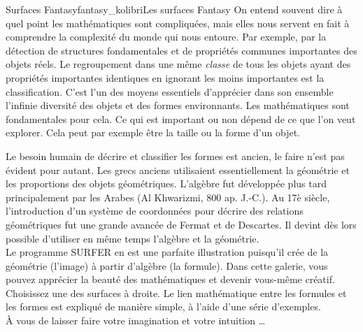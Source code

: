 \begin{surferIntroPage}{Surfaces Fantasy}{fantasy_kolibri}{Les surfaces Fantasy}
On entend souvent dire à quel point les mathématiques sont compliquées, mais elles nous servent en fait à comprendre la complexité du monde qui nous entoure. Par exemple, par la détection de structures fondamentales et de propriétés communes importantes des objets réels. Le regroupement dans une même \textit{classe} de tous les objets ayant des propriétés importantes identiques en ignorant les moins importantes est la classification. C'est l'un des moyens essentiels d'apprécier dans son ensemble l'infinie diversité des objets et des formes environnants. Les mathématiques sont fondamentales pour cela. Ce qui est important ou non dépend de ce que l'on veut explorer. Cela peut par exemple être la taille ou la forme d'un objet.
\\

\vspace{0.4cm}

Le besoin humain de décrire et classifier les formes est ancien, le faire n'est pas évident pour autant. Les grecs anciens utilisaient essentiellement la géométrie et les proportions des objets géométriques. L'algèbre fut développée plus tard principalement par les Arabes (Al Khwarizmi, 800 ap. J.-C.). Au 17è siècle, l'introduction d'un système de coordonnées pour décrire des relations géométriques fut une grande avancée de Fermat et de Descartes. Il devint dès lors possible d'utiliser en même temps l'algèbre et la géométrie.
\\
\vspace{0.4cm}
Le programme SURFER en est une parfaite illustration puisqu'il crée de la géométrie (l'image) à partir d'algèbre (la formule).
Dans cette galerie, vous pouvez apprécier la beauté des mathématiques et devenir vous-même créatif. Choisissez une des surfaces à droite. Le lien mathématique entre les formules et les formes est expliqué de manière simple, à l'aide d'une série d'exemples.\\
\`A vous de laisser faire votre imagination et votre intuition \dots
\end{surferIntroPage}
